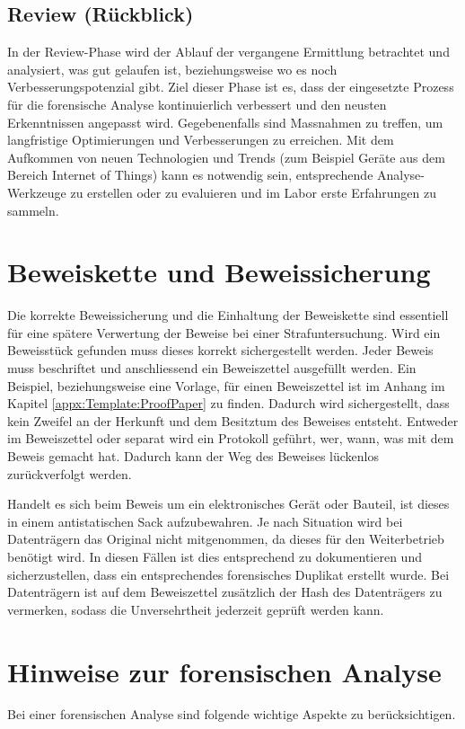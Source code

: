 \subsection{Review (Rückblick)}
In der Review-Phase wird der Ablauf der vergangene Ermittlung betrachtet und analysiert, was gut gelaufen ist, beziehungsweise wo es noch Verbesserungspotenzial gibt. Ziel dieser Phase ist es, dass der eingesetzte Prozess für die forensische Analyse kontinuierlich verbessert und den neusten Erkenntnissen angepasst wird. Gegebenenfalls sind Massnahmen zu treffen, um langfristige Optimierungen und Verbesserungen zu erreichen. Mit dem Aufkommen von neuen Technologien und Trends (zum Beispiel Geräte aus dem Bereich Internet of Things) kann es notwendig sein, entsprechende Analyse-Werkzeuge zu erstellen oder zu evaluieren und im Labor erste Erfahrungen zu sammeln.

\section{Beweiskette und Beweissicherung}
Die korrekte Beweissicherung und die Einhaltung der Beweiskette sind essentiell für eine spätere Verwertung der Beweise bei einer Strafuntersuchung. Wird ein Beweisstück gefunden muss dieses korrekt sichergestellt werden. Jeder Beweis muss beschriftet und anschliessend ein Beweiszettel ausgefüllt werden. Ein Beispiel, beziehungsweise eine Vorlage, für einen Beweiszettel ist im Anhang im Kapitel \ref{appx:Template:ProofPaper}  zu finden. Dadurch wird sichergestellt, dass kein Zweifel an der Herkunft und dem Besitztum des Beweises entsteht. Entweder im Beweiszettel oder separat wird ein Protokoll geführt, wer, wann, was mit dem Beweis gemacht hat. Dadurch kann der Weg des Beweises lückenlos zurückverfolgt werden.

Handelt es sich beim Beweis um ein elektronisches Gerät oder Bauteil, ist dieses in einem antistatischen Sack aufzubewahren. Je nach Situation wird bei Datenträgern das Original nicht mitgenommen, da dieses für den Weiterbetrieb benötigt wird. In diesen Fällen ist dies entsprechend zu dokumentieren und sicherzustellen, dass ein entsprechendes forensisches Duplikat erstellt wurde. Bei Datenträgern ist auf dem Beweiszettel zusätzlich der Hash des Datenträgers zu vermerken, sodass die Unversehrtheit jederzeit geprüft werden kann.


\section{Hinweise zur forensischen Analyse}
Bei einer forensischen Analyse sind folgende wichtige Aspekte zu berücksichtigen.

